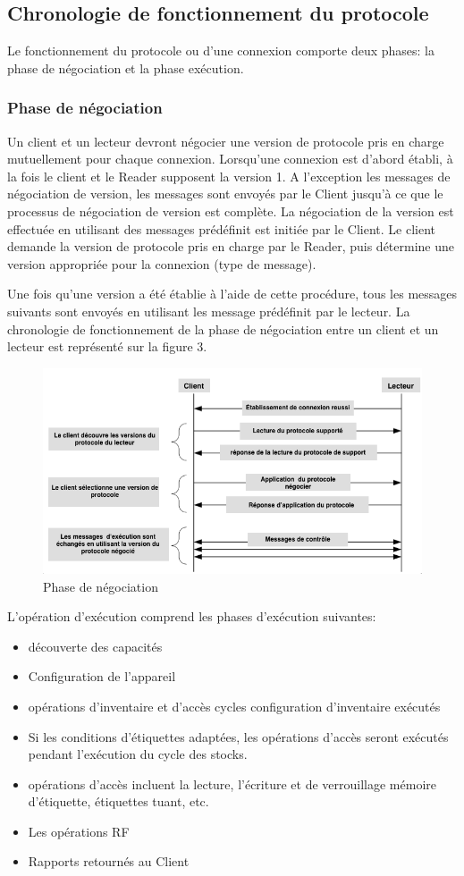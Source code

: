 \documentclass[11pt, a4paper, twoside]{book}
\begin{document}
\subsection{Chronologie de fonctionnement du protocole}
Le fonctionnement du protocole ou d'une connexion comporte deux phases: la phase de négociation et la phase exécution.
\subsubsection{Phase de négociation}
Un client et un lecteur devront négocier une version de protocole pris en charge mutuellement pour chaque connexion. Lorsqu'une connexion  est d'abord établi, à la fois le client et le Reader supposent  la version 1. A l'exception les messages de négociation de version, les messages sont envoyés par le Client  jusqu'à ce que le processus de négociation de version est complète. La négociation de la version est effectuée en utilisant des messages prédéfinit est initiée par le Client. Le client demande la version de protocole pris en charge par le Reader, puis détermine une version appropriée pour la connexion (type de message).
 
Une fois qu'une version a été établie à l'aide de cette procédure, tous les messages suivants sont envoyés en utilisant les message prédéfinit par le lecteur. La chronologie de fonctionnement de la phase de négociation  entre un client et un lecteur est représenté sur la figure 3.
\begin{figure}[H]
\centering
\includegraphics[width=\textwidth]{negotiation2}
\caption{Phase de négociation}
\end{figure}

L'opération d'exécution comprend les phases d'exécution suivantes:
\begin{itemize}
\item découverte des capacités
\item Configuration de l'appareil
\item opérations d'inventaire et d'accès cycles configuration d'inventaire exécutés
\item Si les conditions d'étiquettes adaptées, les opérations d'accès seront exécutés pendant l'exécution du cycle des stocks.
\item  opérations d'accès incluent la lecture, l'écriture et de verrouillage mémoire d'étiquette, étiquettes tuant, etc.
\item Les opérations RF
\item Rapports retournés au Client
\end{itemize}
\end{document}
